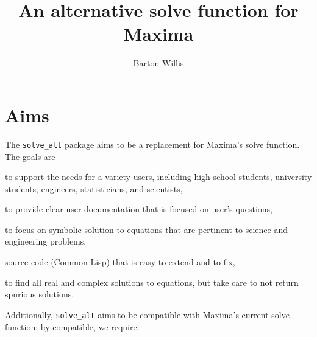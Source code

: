 \documentclass[]{article}%
\title{An alternative solve function for Maxima}
\author{Barton Willis}
\newcommand{\altsolve}{\texttt{solve\_alt}}
\begin{document}
\maketitle

\section{Aims}

The \altsolve\/ package aims to be a replacement for Maxima's solve function. The goals are

\begin{alphalist}[noitemsep]

\item to support the needs for a variety users, including high school students, university students, engineers, statisticians, and scientists,

\item to provide clear user documentation that is focused on user's questions,

\item to focus on symbolic solution to equations that are pertinent to science and engineering problems,

\item source code (Common Lisp) that is easy to extend and to fix,

\item to find all real and complex solutions to equations, but take care to not return spurious solutions.

\end{alphalist}
Additionally, \altsolve\/  aims to be compatible with Maxima's current solve function; by compatible, we require:
\end{document}
